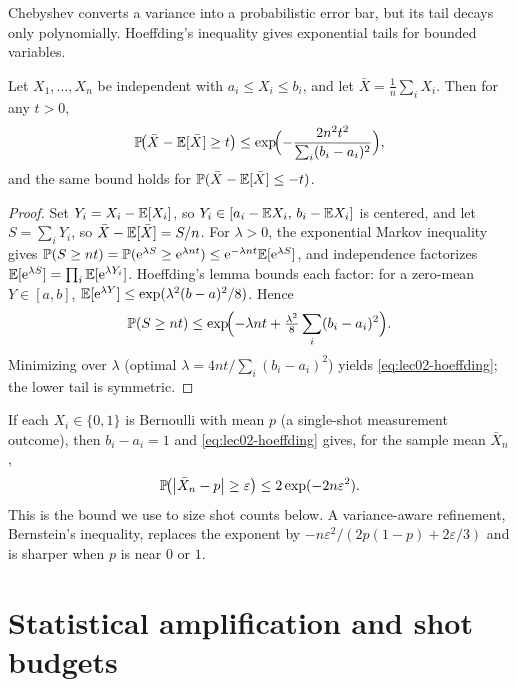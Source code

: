 Chebyshev converts a variance into a probabilistic error bar, but its tail decays
only polynomially. Hoeffding's inequality gives exponential tails for bounded
variables.

\begin{theorem}\label{thm:lec02-hoeffding}
Let $X_1,\dots,X_n$ be independent with $a_i\le X_i\le b_i$, and let
$\bar X=\tfrac1n\sum_i X_i$. Then for any $t>0$,
\begin{equation}\label{eq:lec02-hoeffding}
  \mathbb{P}\!\bigl(\bar X-\mathbb{E}[\bar X]\ge t\bigr)\le
  \exp\!\Bigl(-\frac{2n^{2}t^{2}}{\sum_{i}(b_i-a_i)^{2}}\Bigr),
\end{equation}
and the same bound holds for $\mathbb{P}(\bar X-\mathbb{E}[\bar X]\le-t)$.
\end{theorem}

\begin{proof}
Set $Y_i=X_i-\mathbb{E}[X_i]$, so $Y_i\in[a_i-\mathbb{E} X_i,\,b_i-\mathbb{E} X_i]$ is centered, and let
$S=\sum_i Y_i$, so $\bar X-\mathbb{E}[\bar X]=S/n$. For $\lambda>0$, the exponential
Markov inequality gives
$\mathbb{P}(S\ge nt)=\mathbb{P}(\mathrm{e}^{\lambda S}\ge\mathrm{e}^{\lambda nt})\le\mathrm{e}^{-\lambda nt}\mathbb{E}[\mathrm{e}^{\lambda S}]$,
and independence factorizes $\mathbb{E}[\mathrm{e}^{\lambda S}]=\prod_i\mathbb{E}[\mathrm{e}^{\lambda Y_i}]$.
Hoeffding's lemma bounds each factor: for a zero-mean $Y\in[a,b]$,
$\mathbb{E}[\mathrm{e}^{\lambda Y}]\le\exp(\lambda^{2}(b-a)^{2}/8)$. Hence
\[
  \mathbb{P}(S\ge nt)\le\exp\!\Bigl(-\lambda nt+\tfrac{\lambda^{2}}{8}\sum_i(b_i-a_i)^{2}\Bigr).
\]
Minimizing over $\lambda$ (optimal $\lambda=4nt/\sum_i(b_i-a_i)^{2}$) yields
\eqref{eq:lec02-hoeffding}; the lower tail is symmetric.
\end{proof}

\begin{example}\label{exa:lec02-bernoulli}
If each $X_i\in\{0,1\}$ is Bernoulli with mean $p$ (a single-shot measurement
outcome), then $b_i-a_i=1$ and \eqref{eq:lec02-hoeffding} gives, for the sample
mean $\bar X_n$,
\begin{equation}\label{eq:lec02-chernoff}
  \mathbb{P}\!\bigl(\left\lvert \bar X_n-p \right\rvert\ge\varepsilon\bigr)\le 2\exp(-2n\varepsilon^{2}).
\end{equation}
This is the bound we use to size shot counts below. A variance-aware refinement,
Bernstein's inequality, replaces the exponent by
$-n\varepsilon^{2}/(2p(1-p)+2\varepsilon/3)$ and is sharper when $p$ is near $0$ or $1$.
\end{example}

\section{Statistical amplification and shot budgets}
\label{sec:lec02-4}

